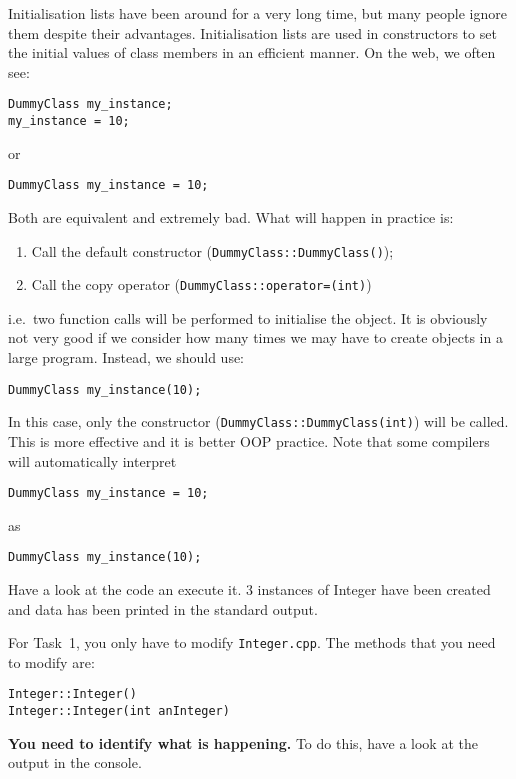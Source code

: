 Initialisation lists have been around for a very long time, but many people ignore them despite their advantages. 
Initialisation lists are used in constructors to set the initial values of class members in an efficient manner. 
On the web, we often see:
\begin{lstlisting}
DummyClass my_instance;
my_instance = 10;
\end{lstlisting}
or
\begin{lstlisting}
DummyClass my_instance = 10;
\end{lstlisting}

Both are equivalent and extremely bad. 
What will happen in practice is:
\begin{enumerate}
\item Call the default constructor (\verb+DummyClass::DummyClass()+);
\item Call the copy operator (\verb+DummyClass::operator=(int)+)
\end{enumerate}
i.e.~two function calls will be performed to initialise the object. It is obviously not very good if we consider how many times we may have to create objects in a large program. 
Instead, we should use:
\begin{lstlisting}
DummyClass my_instance(10);
\end{lstlisting}
In this case, only the constructor (\verb+DummyClass::DummyClass(int)+) will be called. 
This is more effective and it is better OOP practice. 
Note that some compilers will automatically interpret
\begin{lstlisting}
DummyClass my_instance = 10;
\end{lstlisting}
as
\begin{lstlisting}
DummyClass my_instance(10);
\end{lstlisting}

Have a look at the code an execute it. 
3 instances of Integer have been created and data has been printed in the standard output. 

For Task~1, you only have to modify \verb+Integer.cpp+. 
The methods that you need to modify are:
\begin{verbatim}
Integer::Integer()
Integer::Integer(int anInteger)
\end{verbatim}
\large\textbf{You need to identify what is happening.} To do this, have a look at the output in the console. 

